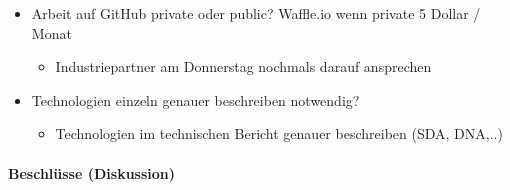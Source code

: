 \begin{itemize}
\begin{itemize}
	\end{itemize}
	\item Arbeit auf GitHub private oder public? Waffle.io wenn private 5 Dollar / Monat
	\begin{itemize}
		\item Industriepartner am Donnerstag nochmals darauf ansprechen
	\end{itemize}
	\item Technologien einzeln genauer beschreiben notwendig?
	\begin{itemize}
		\item Technologien im technischen Bericht genauer beschreiben (SDA, DNA,..)
	\end{itemize}
\end{itemize}

\paragraph{Beschlüsse (Diskussion)}
